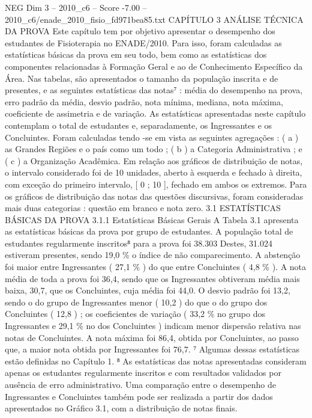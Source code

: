 \begin{textsample}{NEG Dim 3 – 2010\_c6 – Score -7.00 – 2010\_c6/enade\_2010\_fisio\_fd971bea85.txt}  \label{ex:f3_neg_009}
CAPÍTULO 3 ANÁLISE TÉCNICA DA PROVA Este capítulo tem por objetivo apresentar o desempenho dos estudantes de Fisioterapia no ENADE/2010.
Para isso, foram calculadas as estatísticas básicas da prova em seu todo, bem como as estatísticas dos componentes relacionadas à Formação Geral e ao de Conhecimento Específico da Área.
Nas tabelas, são apresentados o tamanho da população inscrita e de presentes, e as seguintes estatísticas das notas⁷ : média do desempenho na prova, erro padrão da média, desvio padrão, nota mínima, mediana, nota máxima, coeficiente de assimetria e de variação.
As estatísticas apresentadas neste capítulo contemplam o total de estudantes e, separadamente, os Ingressantes e os Concluintes.
Foram calculadas tendo -se em vista as seguintes agregações : ( a ) as Grandes Regiões e o país como um todo ; ( b ) a Categoria Administrativa ; e ( c ) a Organização Acadêmica.
Em relação aos gráficos de distribuição de notas, o intervalo considerado foi de 10 unidades, aberto à esquerda e fechado à direita, com exceção do primeiro intervalo, [ 0 ; 10 ], fechado em ambos os extremos.
Para os gráficos de distribuição das notas das questões discursivas, foram consideradas mais duas categorias : questão em branco e nota zero. 3.1 ESTATÍSTICAS BÁSICAS DA PROVA 3.1.1 Estatísticas Básicas Gerais A Tabela 3.1 apresenta as estatísticas básicas da prova por grupo de estudantes.
A população total de estudantes regularmente inscritos⁸ para a prova foi 38.303 Destes, 31.024 estiveram presentes, sendo 19,0 \% o índice de não comparecimento.
A abstenção foi maior entre Ingressantes ( 27,1 \% ) do que entre Concluintes ( 4,8 \% ).
A nota média de toda a prova foi 36,4, sendo que os Ingressantes obtiveram média mais baixa, 30,7, que os Concluintes, cuja média foi 44,0.
O desvio padrão foi 13,2, sendo o do grupo de Ingressantes menor ( 10,2 ) do que o do grupo dos Concluintes ( 12,8 ) ; os coeficientes de variação ( 33,2 \% no grupo dos Ingressantes e 29,1 \% no dos Concluintes ) indicam menor dispersão relativa nas notas de Concluintes.
A nota máxima foi 86,4, obtida por Concluintes, ao passo que, a maior nota obtida por Ingressantes foi 76,7. ⁷ Algumas dessas estatísticas estão definidas no Capítulo 1. ⁸ As estatísticas das notas apresentadas consideram apenas os estudantes regularmente inscritos e com resultados validados por ausência de erro administrativo.
Uma comparação entre o desempenho de Ingressantes e Concluintes também pode ser realizada a partir dos dados apresentados no Gráfico 3.1, com a distribuição de notas finais.

\end{textsample}
